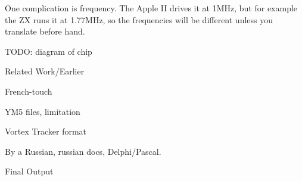 One complication is frequency.  The Apple II drives it at 1MHz, but for
example the ZX runs it at 1.77MHz, so the frequencies will be different
unless you translate before hand.

TODO: diagram of chip


Related Work/Earlier

	French-touch

	YM5 files, limitation

Vortex Tracker format

	By a Russian, russian docs, Delphi/Pascal.

Final Output





